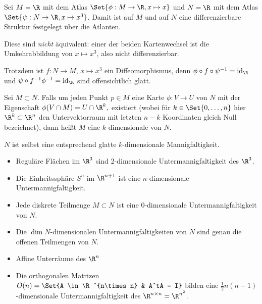 \begin{ex*}
    Sei $M = \R$ mit dem Atlas $\Set{\phi: M \to \R, x \mapsto x}$ und $N = \R$ mit dem Atlas $\Set{\psi: N \to \R, x \mapsto x^3}$.
    Damit ist auf $M$ und auf $N$ eine differenzierbare Struktur festgelegt über die Atlanten.

    Diese sind \emph{nicht} äquivalent: einer der beiden Kartenwechsel ist die Umkehrabbildung von $x \mapsto x^3$, also nicht differenzierbar.

    Trotzdem ist $f: N \to M$, $x \mapsto x^3$ ein Diffeomorphismus, denn $\phi \circ f \circ \psi^{-1} = \id_\R$ und $\psi \circ f^{-1} \phi^{-1} = \id_\R$ sind offensichtlich glatt.
\end{ex*}

\begin{df}[Untermannigfaltigkeit] \label{2.3}
    Sei $M \subset N$.
    Falls um jeden Punkt $p \in M$ eine Karte $\phi: V \to U$ von $N$ mit der
    Eigenschaft
    \begin{math}
        \phi(V \cap M) = U \cap \R^k,
    \end{math}
    existiert (wobei für $k \in \Set{0, \dotsc, n}$ hier $\R^k \subset \R^n$ den Untervektorraum mit letzten $n-k$ Koordinaten gleich Null bezeichnet), dann heißt $M$ eine $k$-dimensionale  von $N$.
    \begin{nt*}
        $N$ ist selbst eine entsprechend glatte $k$-dimensionale Mannigfaltigkeit.
    \end{nt*}
\end{df}

\begin{ex*}
    \begin{itemize}
        \item
            Reguläre Flächen im $\R^3$ sind 2-dimensionale Untermannigfaltigkeit des $\R^3$.
        \item
            Die Einheitssphäre $S^n$ im $\R^{n+1}$ ist eine $n$-dimensionale Untermannigfaltigkeit.
        \item
            Jede diskrete Teilmenge $M \subset N$ ist eine $0$-dimensionale Untermannigfaltigkeit von $N$.
        \item
            Die $\dim N$-dimensionalen Untermannigfaltigkeiten von $N$ sind genau die offenen Teilmengen von $N$.
        \item
            Affine Unterräume des $\R^n$
        \item
            Die orthogonalen Matrizen
            \begin{math}
                O(n) = \Set{A \in \R^{n\times n} & A^tA = I}
            \end{math}
            bilden eine $\frac{1}{2}n(n-1)$-dimensionale Untermannigfaltigkeit des $\R^{n\times n} = \R^{n^2}$.
    \end{itemize}
\end{ex*}

